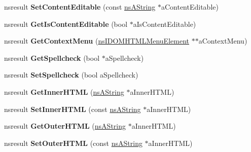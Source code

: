 \begin{DoxyCompactItemize}
nsresult {\bfseries Set\+Content\+Editable} (const \hyperlink{structns_string_container}{ns\+A\+String} $\ast$a\+Content\+Editable)
\item 
\mbox{\label{interfacens_i_d_o_m_h_t_m_l_element_a895932e1759862c02fbe37e099ded658}} 
nsresult {\bfseries Get\+Is\+Content\+Editable} (bool $\ast$a\+Is\+Content\+Editable)
\item 
\mbox{\label{interfacens_i_d_o_m_h_t_m_l_element_a5f2c883d707bf3b02fa29846f92f9b3a}} 
nsresult {\bfseries Get\+Context\+Menu} (\hyperlink{interfacens_i_supports}{ns\+I\+D\+O\+M\+H\+T\+M\+L\+Menu\+Element} $\ast$$\ast$a\+Context\+Menu)
\item 
\mbox{\label{interfacens_i_d_o_m_h_t_m_l_element_a0aee21471b58452ceac3dc9632208d85}} 
nsresult {\bfseries Get\+Spellcheck} (bool $\ast$a\+Spellcheck)
\item 
\mbox{\label{interfacens_i_d_o_m_h_t_m_l_element_ad369c7ebb39ce792fb718082a2f91450}} 
nsresult {\bfseries Set\+Spellcheck} (bool a\+Spellcheck)
\item 
\mbox{\label{interfacens_i_d_o_m_h_t_m_l_element_a3db6e482dd776cc7f1b82bc671be361b}} 
nsresult {\bfseries Get\+Inner\+H\+T\+ML} (\hyperlink{structns_string_container}{ns\+A\+String} $\ast$a\+Inner\+H\+T\+ML)
\item 
\mbox{\label{interfacens_i_d_o_m_h_t_m_l_element_a90a936b0de31a5e8db5ef54f974f819e}} 
nsresult {\bfseries Set\+Inner\+H\+T\+ML} (const \hyperlink{structns_string_container}{ns\+A\+String} $\ast$a\+Inner\+H\+T\+ML)
\item 
\mbox{\label{interfacens_i_d_o_m_h_t_m_l_element_ac869c67cbe43fef286f75bb185f61671}} 
nsresult {\bfseries Get\+Outer\+H\+T\+ML} (\hyperlink{structns_string_container}{ns\+A\+String} $\ast$a\+Inner\+H\+T\+ML)
\item 
\mbox{\label{interfacens_i_d_o_m_h_t_m_l_element_aa19914a792eb014339be5cba3081e534}} 
nsresult {\bfseries Set\+Outer\+H\+T\+ML} (const \hyperlink{structns_string_container}{ns\+A\+String} $\ast$a\+Inner\+H\+T\+ML)
$$
\end{DoxyCompactItemize}
